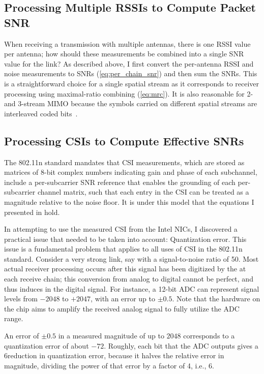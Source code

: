 \subsection{Processing Multiple RSSIs to Compute Packet SNR}
\label{sec:rssi_sum}
When receiving a transmission with multiple antennas, there is one RSSI value per antenna; how should these measurements be combined into a single SNR value for the link? As described above, I first convert the per-antenna RSSI and noise measurements to SNRs (\eqref{eq:per_chain_snr}) and then sum the SNRs. This is a straightforward choice for a single spatial stream as it corresponds to receiver processing using maximal-ratio combining (\eqref{eq:mrc}). It is also reasonable for 2- and 3-stream MIMO because the symbols carried on different spatial streams are interleaved coded bits~\cite{80211n}.

\subsection{Processing CSIs to Compute Effective SNRs}
The 802.11n standard mandates that CSI measurements, which are stored as matrices of 8-bit complex numbers indicating gain and phase of each subchannel, include a per-subcarrier SNR reference that enables the grounding of each per-subcarrier channel matrix, such that each entry in the CSI can be treated as a magnitude relative to the noise floor. It is under this model that the equations I presented in  hold.

In attempting to use the measured CSI from the Intel NICs, I discovered a practical issue that needed to be taken into account: Quantization error. This issue is a fundamental problem that applies to all uses of CSI in the 802.11n standard. Consider a very strong link, say with a signal-to-noise ratio of 50\dB. Most actual receiver processing occurs after this signal has been digitized by the  at each receive chain; this conversion from analog to digital cannot be perfect, and thus induces  in the digital signal. For instance, a 12-bit ADC can represent signal levels from $-2048$ to $+2047$, with an error up to $\pm0.5$. Note that the  hardware on the chip aims to amplify the received analog signal to fully utilize the ADC range.

An error of $\pm0.5$ in a measured magnitude of up to $2048$ corresponds to a quantization error of about $-72$\dB. Roughly, each bit that the ADC outputs gives a 6\dB reduction in quantization error, because it halves the relative error in magnitude, dividing the power of that error by a factor of 4, i.e., 6\dB.

